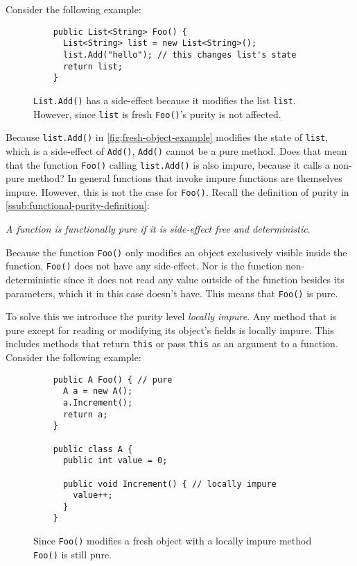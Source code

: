 \documentclass[a4paper,12pt]{article}
\begin{document}
Consider the following example:

\begin{figure}[H]
  \centering
  \begin{lstlisting}
    public List<String> Foo() {
      List<String> list = new List<String>();
      list.Add("hello"); // this changes list's state
      return list;
    }
  \end{lstlisting}
  \caption{\texttt{List.Add()} has a side-effect because it modifies the list \texttt{list}. However, since \texttt{list} is fresh \texttt{Foo()}'s purity is not affected.}
  \label{fig:fresh-object-example}
\end{figure}

Because \texttt{list.Add()} in \autoref{fig:fresh-object-example} modifies the state of \texttt{list}, which is a side-effect of \texttt{Add()}, \texttt{Add()} cannot be a pure method. Does that mean that the function \texttt{Foo()} calling \texttt{list.Add()} is also impure, because it calls a non-pure method? In general functions that invoke impure functions are themselves impure. However, this is not the case for \texttt{Foo()}. Recall the definition of purity in \autoref{ssub:functional-purity-definition}:

\textit{A function is functionally pure if it is side-effect free and deterministic}.

Because the function \texttt{Foo()} only modifies an object exclusively visible inside the function, \texttt{Foo()} does not have any side-effect. Nor is the function non-deterministic since it does not read any value outside of the function besides its parameters, which it in this case doesn't have. This means that \texttt{Foo()} is pure.

To solve this we introduce the purity level \textit{locally impure}. Any method that is pure except for reading or modifying its object's fields is locally impure. This includes methods that return \texttt{this} or pass \texttt{this} as an argument to a function. Consider the following example:

\begin{figure}[H]
  \centering
  \begin{lstlisting}
    public A Foo() { // pure
      A a = new A();
      a.Increment();
      return a;
    }

    public class A {
      public int value = 0;

      public void Increment() { // locally impure
        value++;
      }
    }
  \end{lstlisting}
  \caption{Since \texttt{Foo()} modifies a fresh object with a locally impure method \texttt{Foo()} is still pure.}
  \label{fig:locally-impure-example}
\end{figure}
\end{document}
